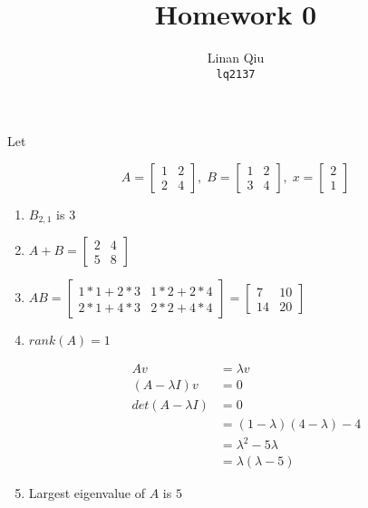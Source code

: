 \documentclass[11pt]{scrartcl}
\title{Homework 0}
\author{Linan Qiu\\\texttt{lq2137}}
\begin{document}
\maketitle

Let 

\[
A = \begin{bmatrix} 1 & 2 \\ 2 & 4 \end{bmatrix}, \; B = \begin{bmatrix} 1 & 2 \\ 3 & 4 \end{bmatrix}, \; x = \begin{bmatrix} 2 \\ 1 \end{bmatrix}
\]

\begin{enumerate}
\item $B_{2,1}$ is $3$

\item $A+B = \begin{bmatrix} 2 & 4 \\ 5 & 8 \end{bmatrix}$

\item $AB = \begin{bmatrix} 1 * 1 + 2 * 3 & 1 * 2 + 2 * 4 \\ 2 * 1 + 4 * 3 & 2 * 2 + 4 * 4 \end{bmatrix} = \begin{bmatrix} 7 & 10 \\ 14 & 20 \end{bmatrix}$

\item $rank(A) = 1$

\begin{align*}
Av &= \lambda v \\
(A - \lambda I)v &= 0 \\
det(A - \lambda I) &= 0 \\
&= (1-\lambda)(4-\lambda)-4 \\
&= \lambda^2 - 5\lambda \\
&= \lambda(\lambda-5) 
\end{align*}
\item Largest eigenvalue of $A$ is $5$


\end{enumerate}
\end{document}
